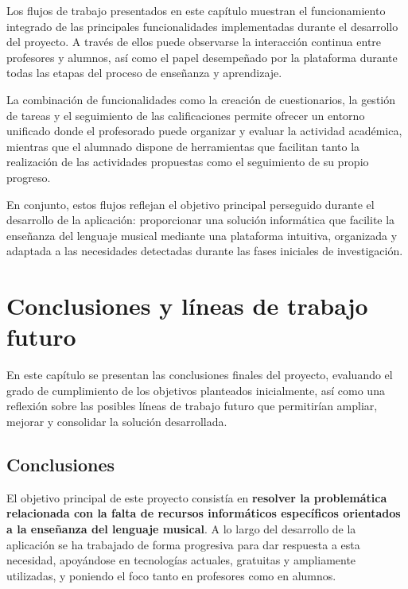 Los flujos de trabajo presentados en este capítulo muestran el funcionamiento integrado de las principales funcionalidades implementadas durante el desarrollo del proyecto. A través de ellos puede observarse la interacción continua entre profesores y alumnos, así como el papel desempeñado por la plataforma durante todas las etapas del proceso de enseñanza y aprendizaje.

La combinación de funcionalidades como la creación de cuestionarios, la gestión de tareas y el seguimiento de las calificaciones permite ofrecer un entorno unificado donde el profesorado puede organizar y evaluar la actividad académica, mientras que el alumnado dispone de herramientas que facilitan tanto la realización de las actividades propuestas como el seguimiento de su propio progreso.

En conjunto, estos flujos reflejan el objetivo principal perseguido durante el desarrollo de la aplicación: proporcionar una solución informática que facilite la enseñanza del lenguaje musical mediante una plataforma intuitiva, organizada y adaptada a las necesidades detectadas durante las fases iniciales de investigación.


\chapter{Conclusiones y líneas de trabajo futuro}
\label{sec:conclu}
En este capítulo se presentan las conclusiones finales del proyecto, evaluando el grado de cumplimiento de los objetivos planteados inicialmente, así como una reflexión sobre las posibles líneas de trabajo futuro que permitirían ampliar, mejorar y consolidar la solución desarrollada.

\section{Conclusiones}

El objetivo principal de este proyecto consistía en \textbf{resolver la problemática relacionada con la falta de recursos informáticos específicos orientados a la enseñanza del lenguaje musical}. A lo largo del desarrollo de la aplicación se ha trabajado de forma progresiva para dar respuesta a esta necesidad, apoyándose en tecnologías actuales, gratuitas y ampliamente utilizadas, y poniendo el foco tanto en profesores como en alumnos.

